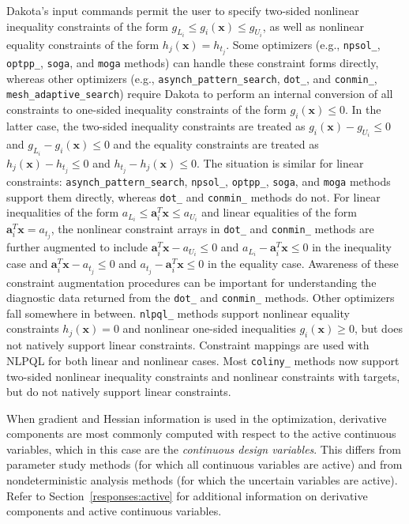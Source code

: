 Dakota's input commands permit the user to specify two-sided nonlinear
inequality constraints of the form $g_{L_{i}} \leq g_{i}(\mathbf{x})
\leq g_{U_{i}}$, as well as nonlinear equality constraints of the form
$h_{j}(\mathbf{x}) = h_{t_{j}}$. Some optimizers (e.g.,
\texttt{npsol\_}, \texttt{optpp\_}, \texttt{soga}, and \texttt{moga}
methods) can handle these constraint forms directly, whereas other
optimizers (e.g., \texttt{asynch\_pattern\_search}, \texttt{dot\_},
and \texttt{conmin\_}, \texttt{mesh\_adaptive\_search}) require Dakota
to perform an internal conversion of all constraints to one-sided
inequality constraints of the form $g_{i}(\mathbf{x}) \leq 0$. In the
latter case, the two-sided inequality constraints are treated as
$g_{i}(\mathbf{x}) - g_{U_{i}} \leq 0$ and $g_{L_{i}} -
g_{i}(\mathbf{x}) \leq 0$ and the equality constraints are treated as
$h_{j}(\mathbf{x}) - h_{t_{j}} \leq 0$ and $h_{t_{j}} -
h_{j}(\mathbf{x}) \leq 0$. The situation is similar for linear
constraints: \texttt{asynch\_pattern\_search}, \texttt{npsol\_},
\texttt{optpp\_}, \texttt{soga}, and \texttt{moga} methods support
them directly, whereas \texttt{dot\_} and \texttt{conmin\_} methods do
not. For linear inequalities of the form $a_{L_{i}} \leq
\mathbf{a}_{i}^{T}\mathbf{x} \leq a_{U_{i}}$ and linear equalities of
the form $\mathbf{a}_{i}^{T}\mathbf{x} = a_{t_{j}}$, the nonlinear
constraint arrays in \texttt{dot\_} and \texttt{conmin\_} methods are
further augmented to include $\mathbf{a}_{i}^{T}\mathbf{x} - a_{U_{i}}
\leq 0$ and $a_{L_{i}} - \mathbf{a}_{i}^{T}\mathbf{x} \leq 0$ in the
inequality case and $\mathbf{a}_{i}^{T}\mathbf{x} - a_{t_{j}} \leq 0$
and $a_{t_{j}} - \mathbf{a}_{i}^{T}\mathbf{x} \leq 0$ in the equality
case. Awareness of these constraint augmentation procedures can be
important for understanding the diagnostic data returned from the
\texttt{dot\_} and \texttt{conmin\_} methods. Other optimizers fall
somewhere in between.  \texttt{nlpql\_} methods support nonlinear
equality constraints $h_{j}(\mathbf{x}) = 0$ and nonlinear one-sided
inequalities $g_{i}(\mathbf{x}) \geq 0$, but does not natively support
linear constraints. Constraint mappings are used with NLPQL for both
linear and nonlinear cases. Most \texttt{coliny\_} methods now support
two-sided nonlinear inequality constraints and nonlinear constraints
with targets, but do not natively support linear constraints.

When gradient and Hessian information is used in the optimization,
derivative components are most commonly computed with respect to the
active continuous variables, which in this case are the
\emph{continuous design variables}. This differs from parameter study
methods (for which all continuous variables are active) and from
nondeterministic analysis methods (for which the uncertain variables
are active). Refer to Section~\ref{responses:active} for additional
information on derivative components and active continuous variables.

